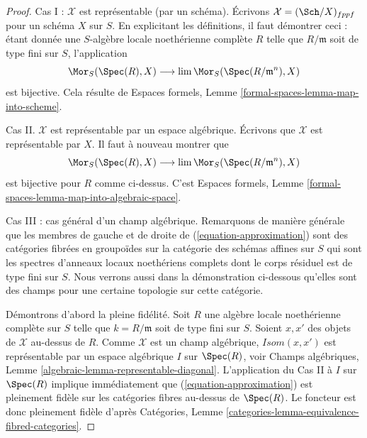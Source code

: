 \begin{proof}
Cas I : $\mathcal{X}$ est représentable (par un schéma). Écrivons
$\mathcal{X} = (\Sch/X)_{fppf}$ pour un schéma $X$ sur $S$.
En explicitant les définitions, il faut démontrer ceci : étant donnée
une $S$-algèbre locale noethérienne complète $R$ telle que $R/\mathfrak m$ soit
de type fini sur $S$, l'application
$$
\Mor_S(\Spec(R), X) \longrightarrow \lim \Mor_S(\Spec(R/\mathfrak m^n), X)
$$
est bijective. Cela résulte de Espaces formels, Lemme
\ref{formal-spaces-lemma-map-into-scheme}.

\medskip\noindent
Cas II. $\mathcal{X}$ est représentable par un espace algébrique. Écrivons
que $\mathcal{X}$ est représentable par $X$. Il faut à nouveau montrer que
$$
\Mor_S(\Spec(R), X) \longrightarrow \lim \Mor_S(\Spec(R/\mathfrak m^n), X)
$$
est bijective pour $R$ comme ci-dessus. C'est Espaces formels, Lemme
\ref{formal-spaces-lemma-map-into-algebraic-space}.

\medskip\noindent
Cas III : cas général d'un champ algébrique. Remarquons de manière générale que
les membres de gauche et de droite de (\ref{equation-approximation}) sont des
catégories fibrées en groupoïdes sur la catégorie des schémas affines
sur $S$ qui sont les spectres d'anneaux locaux noethériens complets
dont le corps résiduel est de type fini sur $S$. Nous verrons aussi dans la
démonstration ci-dessous qu'elles sont des champs pour une certaine topologie sur cette
catégorie.

\medskip\noindent
Démontrons d'abord la pleine fidélité. Soit $R$ une algèbre locale noethérienne complète
sur $S$ telle que $k = R/\mathfrak m$ soit de type fini sur $S$.
Soient $x, x'$ des objets de $\mathcal{X}$ au-dessus de $R$. Comme $\mathcal{X}$ est
un champ algébrique, $\mathit{Isom}(x, x')$ est représentable par un
espace algébrique $I$ sur $\Spec(R)$, voir
Champs algébriques, Lemme \ref{algebraic-lemma-representable-diagonal}.
L'application du Cas II à $I$ sur $\Spec(R)$ implique immédiatement que
(\ref{equation-approximation}) est pleinement fidèle sur les catégories fibres au-dessus de
$\Spec(R)$. Le foncteur est donc pleinement fidèle d'après
Catégories, Lemme \ref{categories-lemma-equivalence-fibred-categories}.


\end{proof}
